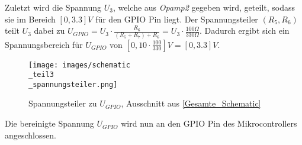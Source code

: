 Zuletzt wird die Spannung $U_3$, welche aus \textit{Opamp2} gegeben wird, geteilt, sodass
sie im Bereich $[0, 3.3]V$ für den GPIO Pin liegt.
Der Spannungsteiler $(R_5, R_6)$ teilt $U_3$ dabei zu
$U_{GPIO} = U_3 \cdot \frac{R_6}{(R_5 + R_7) + R_6} = U_3 \cdot \frac{100 \Omega}{330 \Omega}$. \newline
Dadurch ergibt sich ein Spannungsbereich für $U_{GPIO}$ von
$[0, 10 \cdot \frac{100}{330}]V = [0, 3.3]V$.
\begin{figure}[h!]
	\centering
	\texttt{[image: images/schematic\\\_teil3\\\_spannungsteiler.png]}
	\caption{Spannungsteiler zu $U_{GPIO}$, Ausschnitt aus \ref{Gesamte_Schematic}}
\end{figure}
\newline
Die bereinigte Spannung $U_{GPIO}$ wird nun an den GPIO Pin des Mikrocontrollers angeschlossen.



